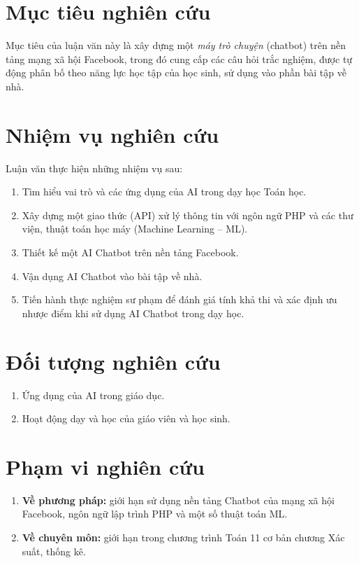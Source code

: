\section{Mục tiêu nghiên cứu}
Mục tiêu của luận văn này là xây dựng một \textit{máy trò chuyện} (chatbot) trên nền tảng mạng xã hội Facebook, trong đó cung cấp các câu hỏi trắc nghiệm, được tự động phân bố theo năng lực học tập của học sinh, sử dụng vào phần bài tập về nhà.

\section{Nhiệm vụ nghiên cứu}
Luận văn thực hiện những nhiệm vụ sau:\par
\begin{enumerate}[label=\textbf{\thesection.\arabic*.},align=left,left=0cm..1cm]
	\item Tìm hiểu vai trò và các ứng dụng của AI trong dạy học Toán học.
	\item Xây dựng một giao thức (API) xử lý thông tin với ngôn ngữ PHP và các thư viện, thuật toán học máy (Machine Learning – ML).
	\item Thiết kế một AI Chatbot trên nền tảng Facebook.
	\item Vận dụng AI Chatbot vào bài tập về nhà.
	\item Tiến hành thực nghiệm sư phạm để đánh giá tính khả thi và xác định ưu nhược điểm khi sử dụng AI Chatbot trong dạy học.
\end{enumerate}\par

\section{Đối tượng nghiên cứu}
\begin{enumerate}[label=\textbf{\thesection.\arabic*.},align=left,left=0cm..1cm]
\item Ứng dụng của AI trong giáo dục.\par
\item Hoạt động dạy và học của giáo viên và học sinh.\par
\end{enumerate}

\section{Phạm vi nghiên cứu}
\begin{enumerate}[label=\textbf{\thesection.\arabic*.},align=left,left=0cm..1cm]
	\item \textbf{Về phương pháp:} giới hạn sử dụng nền tảng Chatbot của mạng xã hội Facebook, ngôn ngữ lập trình PHP và một số thuật toán ML.\par
	\item \textbf{Về chuyên môn:} giới hạn trong chương trình Toán 11 cơ bản chương Xác suất, thống kê.\par
\end{enumerate}

